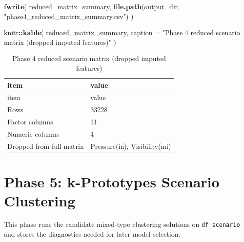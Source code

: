 \documentclass[
]{article}
\newenvironment{Shaded}{\begin{snugshade}}{\end{snugshade}}
\newcommand{\AttributeTok}[1]{\textcolor[rgb]{0.13,0.29,0.53}{#1}}
\newcommand{\FunctionTok}[1]{\textcolor[rgb]{0.13,0.29,0.53}{\textbf{#1}}}
\newcommand{\NormalTok}[1]{#1}
\newcommand{\SpecialCharTok}[1]{\textcolor[rgb]{0.81,0.36,0.00}{\textbf{#1}}}
\newcommand{\StringTok}[1]{\textcolor[rgb]{0.31,0.60,0.02}{#1}}
\begin{document}
\begin{Shaded}
\begin{Highlighting}[]
\FunctionTok{fwrite}\NormalTok{(}
\NormalTok{  reduced\_matrix\_summary,}
  \FunctionTok{file.path}\NormalTok{(output\_dir, }\StringTok{"phase4\_reduced\_matrix\_summary.csv"}\NormalTok{)}
\NormalTok{)}

\NormalTok{knitr}\SpecialCharTok{::}\FunctionTok{kable}\NormalTok{(}
\NormalTok{  reduced\_matrix\_summary,}
  \AttributeTok{caption =} \StringTok{"Phase 4 reduced scenario matrix (dropped imputed features)"}
\NormalTok{)}
\end{Highlighting}
\end{Shaded}

\begin{longtable}[]{@{}ll@{}}
\caption{Phase 4 reduced scenario matrix (dropped imputed
features)}\tabularnewline
\toprule\noalign{}
item & value \\
\midrule\noalign{}
\endfirsthead
\toprule\noalign{}
item & value \\
\midrule\noalign{}
\endhead
\bottomrule\noalign{}
\endlastfoot
Rows & 33228 \\
Factor columns & 11 \\
Numeric columns & 4 \\
Dropped from full matrix & Pressure(in), Visibility(mi) \\
\end{longtable}

\section{Phase 5: k-Prototypes Scenario
Clustering}\label{phase-5-k-prototypes-scenario-clustering}

This phase runs the candidate mixed-type clustering solutions on
\texttt{df\_scenario} and stores the diagnostics needed for later model
selection.
\end{document}

